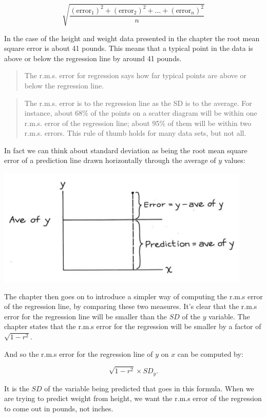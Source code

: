 \documentclass[
]{book}
\begin{document}
\[
\sqrt{\frac{(\text{error}_1)^2 + (\text{error}_2)^2 + \dots + (\text{error}_n)^2}{n}}
\]

In the case of the height and weight data presented in the chapter the root mean square error is about 41 pounds. This means that a typical point in the data is above or below the regression line by around 41 pounds.

\begin{quote}
The r.m.s. error for regression says how far typical points are above or below the regression line.
\end{quote}

\begin{quote}
The r.m.s. error is to the regression line as the SD is to the average. For instance, about 68\% of the points on a scatter diagram will be within one r.m.s. error of the regression line; about 95\% of them will be within two r.m.s. errors. This rule of thumb holds for many data sets, but not all.
\end{quote}

In fact we can think about standard deviation as being the root mean square error of a prediction line drawn horizontally through the average of \(y\) values:

\includegraphics{images/Ch11Img01.png}

The chapter then goes on to introduce a simpler way of computing the r.m.s error of the regression line, by comparing these two measures. It's clear that the r.m.s error for the regression line will be smaller than the \(SD\) of the \(y\) variable. The chapter states that the r.m.s error for the regression will be smaller by a factor of \(\sqrt{1-r^2}\).

And so the r.m.s error for the regression line of \(y\) on \(x\) can be computed by:

\[
\sqrt{1-r^2} \times SD_y.
\]

It is the \(SD\) of the variable being predicted that goes in this formula. When we are trying to predict weight from height, we want the r.m.s error of the regression to come out in pounds, not inches.
\end{document}
